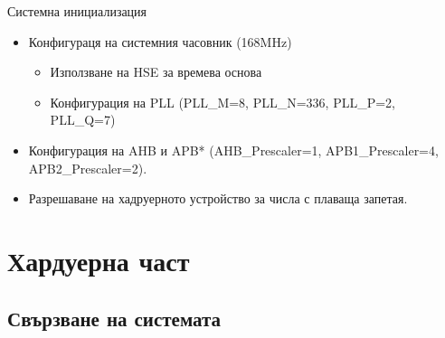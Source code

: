 \documentclass{beamer}
\begin{document}
\begin{frame}[t]
	\pause
	\begin{block}{Системна инициализация}
		\begin{itemize}
			\pause
			\item Конфигураця на системния часовник (168MHz)
			\begin{itemize}
				\pause
				\item Използване на HSE за времева основа
				\pause
				\item Конфигурация на PLL (PLL\_M=8, PLL\_N=336, PLL\_P=2, PLL\_Q=7)
			\end{itemize}
			\pause
			\item Конфигурация на AHB и APB*  (AHB\_Prescaler=1, APB1\_Prescaler=4, APB2\_Prescaler=2).
			\item Разрешаване на хадруерното устройство за числа с плаваща запетая.
		\end{itemize}
	\end{block}

\end{frame}


\section{Хардуерна част}

\subsection{Свързване на системата}
\end{document}
